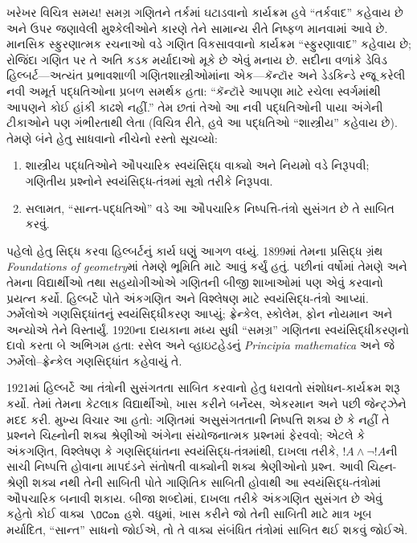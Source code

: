 ખરેખર વિચિત્ર સમય!{} સમગ્ર ગણિતને તર્કમાં ઘટાડવાનો
કાર્યક્રમ હવે ``તર્કવાદ'' કહેવાય છે અને ઉપર જણાવેલી
મુશ્કેલીઓને કારણે તેને સામાન્ય રીતે નિષ્ફળ માનવામાં
આવે છે. માનસિક સ્ફુરણાત્મક રચનાઓ વડે ગણિત વિકસાવવાનો
કાર્યક્રમ ``સ્ફુરણાવાદ'' કહેવાય છે; રોજિંદા ગણિત પર
તે અતિ કડક મર્યાદાઓ મૂકે છે એવું મનાય છે. સદીના
વળાંકે ડેવિડ હિલ્બર્ટ—અત્યંત પ્રભાવશાળી ગણિતશાસ્ત્રીઓમાંના
એક—કૅન્ટૉર અને ડેડકિન્ડે રજૂ કરેલી નવી અમૂર્ત
પદ્ધતિઓના પ્રબળ સમર્થક હતા: ``કૅન્ટૉરે આપણા માટે
રચેલા સ્વર્ગમાંથી આપણને કોઈ હાંકી કાઢશે નહીં.''
તેમ છતાં તેઓ આ નવી પદ્ધતિઓની પાયા અંગેની ટીકાઓને
પણ ગંભીરતાથી લેતા (વિચિત્ર રીતે, હવે આ પદ્ધતિઓ
``શાસ્ત્રીય'' કહેવાય છે). તેમણે બંને હેતુ સાધવાનો
નીચેનો રસ્તો સૂચવ્યો:
\begin{enumerate}
\item શાસ્ત્રીય પદ્ધતિઓને ઔપચારિક સ્વયંસિદ્ધ વાક્યો અને
  નિયમો વડે નિરૂપવી; ગણિતીય પ્રશ્નોને સ્વયંસિદ્ધ-તંત્રમાં
  સૂત્રો તરીકે નિરૂપવા.
\item સલામત, ``સાન્ત-પદ્ધતિઓ'' વડે આ ઔપચારિક
  નિષ્પત્તિ-તંત્રો સુસંગત છે તે સાબિત કરવું.
\end{enumerate}

પહેલો હેતુ સિદ્ધ કરવા હિલ્બર્ટનું કાર્ય ઘણું આગળ
વધ્યું. 1899માં તેમના પ્રસિદ્ધ ગ્રંથ \emph{Foundations
of geometry}માં તેમણે ભૂમિતિ માટે આવું કર્યું હતું.
પછીનાં વર્ષોમાં તેમણે અને તેમના વિદ્યાર્થીઓ તથા
સહયોગીઓએ ગણિતની બીજી શાખાઓમાં પણ એવું કરવાનો
પ્રયત્ન કર્યો. હિલ્બર્ટે પોતે અંકગણિત અને વિશ્લેષણ
માટે સ્વયંસિદ્ધ-તંત્રો આપ્યાં. ઝર્મેલોએ ગણસિદ્ધાંતનું
સ્વયંસિદ્ધીકરણ આપ્યું; ફ્રેન્કેલ, સ્કોલેમ,
ફોન નોયમાન અને અન્યોએ તેને વિસ્તાર્યું. 1920ના
દાયકાના મધ્ય સુધી ``સમગ્ર'' ગણિતના સ્વયંસિદ્ધીકરણનો
દાવો કરતા બે અભિગમ હતા: રસેલ અને વ્હાઇટહેડનું
\emph{Principia mathematica} અને જે ઝર્મેલો--ફ્રેન્કેલ
ગણસિદ્ધાંત કહેવાયું તે.

1921માં હિલ્બર્ટે આ તંત્રોની સુસંગતતા સાબિત કરવાનો
હેતુ ધરાવતો સંશોધન-કાર્યક્રમ શરૂ કર્યો. તેમાં તેમના
કેટલાક વિદ્યાર્થીઓ, ખાસ કરીને બર્નેય્સ, એકરમાન
અને પછી જેન્ટ્ઝેને મદદ કરી. મુખ્ય વિચાર આ હતો:
ગણિતમાં અસુસંગતતાની નિષ્પત્તિ શક્ય છે કે નહીં
તે પ્રશ્નને ચિહ્નોની શક્ય શ્રેણીઓ અંગેના સંયોજનાત્મક
પ્રશ્નમાં ફેરવવો; એટલે કે અંકગણિત, વિશ્લેષણ કે
ગણસિદ્ધાંતના સ્વયંસિદ્ધ-તંત્રમાંથી, દાખલા તરીકે,
$!A \land \lnot !A$ની સાચી નિષ્પત્તિ હોવાના
માપદંડને સંતોષતી વાક્યોની શક્ય શ્રેણીઓનો પ્રશ્ન.
આવી ચિહ્ન-શ્રેણી શક્ય નથી તેની સાબિતી પોતે ગાણિતિક
સાબિતી હોવાથી આ સ્વયંસિદ્ધ-તંત્રોમાં ઔપચારિક બનાવી
શકાય. બીજા શબ્દોમાં, દાખલા તરીકે અંકગણિત સુસંગત
છે એવું કહેતો કોઈ વાક્ય~$\OCon$ હશે. વધુમાં,
ખાસ કરીને જો તેની સાબિતી માટે માત્ર ખૂબ મર્યાદિત,
``સાન્ત'' સાધનો જોઈએ, તો તે વાક્ય સંબંધિત તંત્રોમાં
સાબિત થઈ શકવું જોઈએ.

